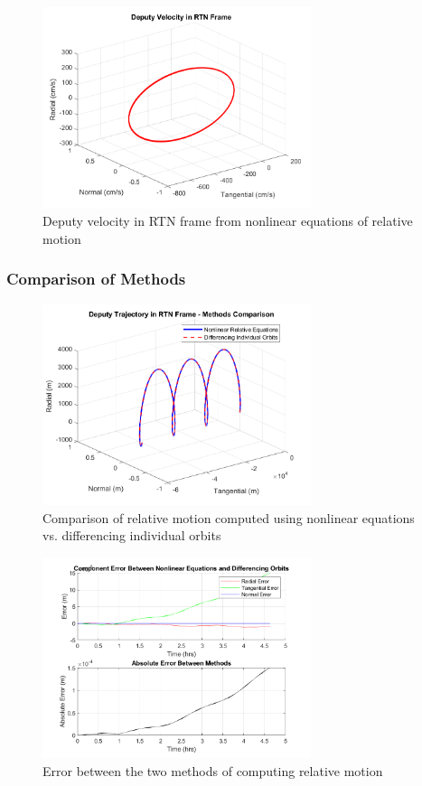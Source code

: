 \begin{figure}[H]
    \centering
    \includegraphics[width=0.7\textwidth]{PS2/Figures/Case1_RelativeVelocity.png}
    \caption{Deputy velocity in RTN frame from nonlinear equations of relative motion}
    \label{fig:relative_velocity}
\end{figure}

\subsubsection{Comparison of Methods}

\begin{figure}[H]
    \centering
    \includegraphics[width=0.7\textwidth]{PS2/Figures/Case1_MethodsComparison.png}
    \caption{Comparison of relative motion computed using nonlinear equations vs. differencing individual orbits}
    \label{fig:methods_comparison}
\end{figure}

\begin{figure}[H]
    \centering
    \includegraphics[width=0.7\textwidth]{PS2/Figures/Case1_MethodsError.png}
    \caption{Error between the two methods of computing relative motion}
    \label{fig:methods_error}
\end{figure}

